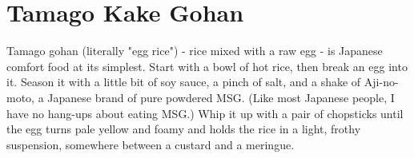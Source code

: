\clearpage
\section{Tamago Kake Gohan}


  Tamago gohan (literally "egg rice") - rice mixed with a raw egg - is Japanese comfort food at its simplest. Start with a bowl of hot rice, then break an egg into it. Season it with a little bit of soy sauce, a pinch of salt, and a shake of Aji-no-moto, a Japanese brand of pure powdered MSG. (Like most Japanese people, I have no hang-ups about eating MSG.) Whip it up with a pair of chopsticks until the egg turns pale yellow and foamy and holds the rice in a light, frothy suspension, somewhere between a custard and a meringue.

